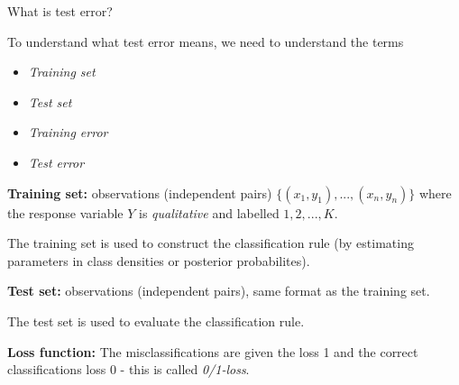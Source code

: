 \documentclass[10pt,ignorenonframetext,]{beamer}
\providecommand{\tightlist}{%
  \setlength{\itemsep}{0pt}\setlength{\parskip}{0pt}}
\begin{document}
\begin{frame}

\begin{block}{What is test error?}

\vspace{2mm}

To understand what test error means, we need to understand the terms

\begin{itemize}
\tightlist
\item
  \emph{Training set}
\item
  \emph{Test set}
\item
  \emph{Training error}
\item
  \emph{Test error}
\end{itemize}

\end{block}

\end{frame}

\begin{frame}

\textbf{Training set:} observations (independent pairs)
\(\{(x_1, y_1), ..., (x_n, y_n)\}\) where the response variable \(Y\) is
\emph{qualitative} and labelled \(1, 2, ..., K\).

The training set is used to construct the classification rule (by
estimating parameters in class densities or posterior probabilites).

\vspace{2mm}

\textbf{Test set:} observations (independent pairs), same format as the
training set.

The test set is used to evaluate the classification rule.

\vspace{2mm}

\textbf{Loss function:} The misclassifications are given the loss 1 and
the correct classifications loss 0 - this is called \emph{0/1-loss}.

\end{frame}
\end{document}
